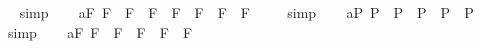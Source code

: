 \begin{isabellebody}
\isadelimproof
\ %
\endisadelimproof
%
\isatagproof
{}\isamarkupfalse%
\ simp\ \isamarkupfalse%
%
\endisatagproof
{\isafoldproof}%
%
\isadelimproof
%
\endisadelimproof
\isanewline
\ \isamarkupfalse%
\ a{}{}{\isacharunderscore}{}{\isacharunderscore}F{\isacharcolon}\ {\isachardoublequoteopen}{\isacharbrackleft}{\isacharparenleft}{\isasymphi}\isactrlsup F\ \isactrlbold {\isasymrightarrow}\ {\isacharparenleft}{\isasympsi}\isactrlsup F\ \isactrlbold {\isasymrightarrow}\ {\isasymchi}\isactrlsup F{\isacharparenright}{\isacharparenright}\ \isactrlbold {\isasymrightarrow}\ {\isacharparenleft}{\isacharparenleft}{\isasymphi}\isactrlsup F\ \isactrlbold {\isasymrightarrow}\ {\isasympsi}\isactrlsup F{\isacharparenright}\ \isactrlbold {\isasymrightarrow}\ {\isacharparenleft}{\isasymphi}\isactrlsup F\ \isactrlbold {\isasymrightarrow}\ {\isasymchi}\isactrlsup F{\isacharparenright}{\isacharparenright}{\isacharbrackright}\ {\isacharequal}\ {\isasymtop}{\isachardoublequoteclose}%
\isadelimproof
\ %
\endisadelimproof
%
\isatagproof
{}\isamarkupfalse%
\ simp\ \isamarkupfalse%
%
\endisatagproof
{\isafoldproof}%
%
\isadelimproof
%
\endisadelimproof
\isanewline
\ \isamarkupfalse%
\ a{}{}{\isacharunderscore}{}{\isacharunderscore}P{\isacharcolon}\ {\isachardoublequoteopen}{\isacharbrackleft}{\isacharparenleft}\isactrlbold {\isasymnot}{\isasymphi}\isactrlsup P\ \isactrlbold {\isasymrightarrow}\ \isactrlbold {\isasymnot}{\isasympsi}\isactrlsup P{\isacharparenright}\ \isactrlbold {\isasymrightarrow}\ {\isacharparenleft}{\isacharparenleft}\isactrlbold {\isasymnot}{\isasymphi}\isactrlsup P\ \isactrlbold {\isasymrightarrow}\ {\isasympsi}\isactrlsup P{\isacharparenright}\ \isactrlbold {\isasymrightarrow}\ {\isasymphi}\isactrlsup P{\isacharparenright}{\isacharbrackright}\ {\isacharequal}\ {\isasymtop}{\isachardoublequoteclose}%
\isadelimproof
\ %
\endisadelimproof
%
\isatagproof
{}\isamarkupfalse%
\ simp\ \isamarkupfalse%
%
\endisatagproof
{\isafoldproof}%
%
\isadelimproof
%
\endisadelimproof
\isanewline
\ \isamarkupfalse%
\ a{}{}{\isacharunderscore}{}{\isacharunderscore}F{\isacharcolon}\ {\isachardoublequoteopen}{\isacharbrackleft}{\isacharparenleft}\isactrlbold {\isasymnot}{\isasymphi}\isactrlsup F\ \isactrlbold {\isasymrightarrow}\ \isactrlbold {\isasymnot}{\isasympsi}\isactrlsup F{\isacharparenright}\ \isactrlbold {\isasymrightarrow}\ {\isacharparenleft}{\isacharparenleft}\isactrlbold {\isasymnot}{\isasymphi}\isactrlsup F\ \isactrlbold {\isasymrightarrow}\ {\isasympsi}\isactrlsup F{\isacharparenright}\ \isactrlbold {\isasymrightarrow}\ {\isasymphi}\isactrlsup F{\isacharparenright}{\isacharbrackright}\ {\isacharequal}\ {\isasymtop}{\isachardoublequoteclose}%

\end{isabellebody}
